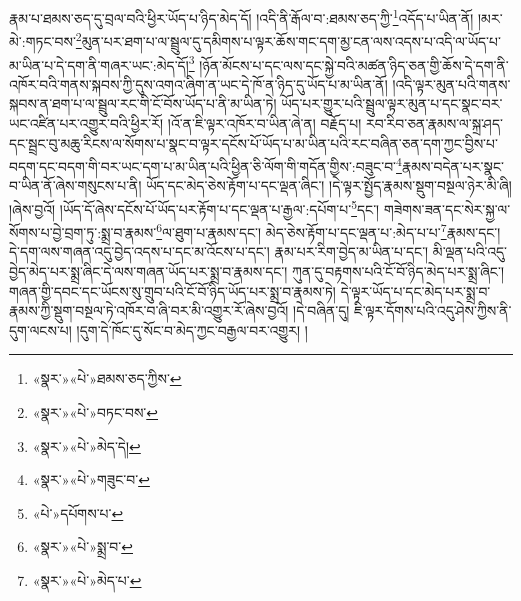 རྣམ་པ་ཐམས་ཅད་དུ་བྲལ་བའི་ཕྱིར་ཡོད་པ་ཉིད་མེད་དོ། །འདི་ནི་རྒོལ་བ་:ཐམས་ཅད་ཀྱི་\footnote{«སྣར་»«པེ་»ཐམས་ཅད་ཀྱིས་}འདོད་པ་ཡིན་ནོ། །མར་མེ་:གཏང་བས་\footnote{«སྣར་»«པེ་»བཏང་བས་}མུན་པར་ཐག་པ་ལ་སྦྲུལ་དུ་དམིགས་པ་ལྟར་ཆོས་གང་དག་མྱ་ངན་ལས་འདས་པ་འདི་ལ་ཡོད་པ་མ་ཡིན་པ་དེ་དག་ནི་གཞར་ཡང་:མེད་དོ།\footnote{«སྣར་»«པེ་»མེད་དེ།} །ཉོན་མོངས་པ་དང་ལས་དང་སྐྱེ་བའི་མཚན་ཉིད་ཅན་གྱི་ཆོས་དེ་དག་ནི་འཁོར་བའི་གནས་སྐབས་ཀྱི་དུས་འགའ་ཞིག་ན་ཡང་དེ་ཁོ་ན་ཉིད་དུ་ཡོད་པ་མ་ཡིན་ནོ། །འདི་ལྟར་མུན་པའི་གནས་སྐབས་ན་ཐག་པ་ལ་སྦྲུལ་རང་གི་ངོ་བོས་ཡོད་པ་ནི་མ་ཡིན་ཏེ། ཡོད་པར་གྱུར་པའི་སྦྲུལ་ལྟར་མུན་པ་དང་སྣང་བར་ཡང་འཛིན་པར་འགྱུར་བའི་ཕྱིར་རོ། །འོ་ན་ཇི་ལྟར་འཁོར་བ་ཡིན་ཞེ་ན། བརྗོད་པ། རབ་རིབ་ཅན་རྣམས་ལ་སྐྲ་ཤད་དང་སྦྲང་བུ་མཆུ་རིངས་ལ་སོགས་པ་སྣང་བ་ལྟར་དངོས་པོ་ཡོད་པ་མ་ཡིན་པའི་རང་བཞིན་ཅན་དག་ཀྱང་བྱིས་པ་བདག་དང་བདག་གི་བར་ཡང་དག་པ་མ་ཡིན་པའི་ཕྱིན་ཅི་ལོག་གི་གདོན་གྱིས་:བཟུང་བ་\footnote{«སྣར་»«པེ་»གཟུང་བ་}རྣམས་བདེན་པར་སྣང་བ་ཡིན་ནོ་ཞེས་གསུངས་པ་ནི། ཡོད་དང་མེད་ཅེས་རྟོག་པ་དང་ལྡན་ཞིང་། །དེ་ལྟར་སྤྱོད་རྣམས་སྡུག་བསྔལ་ཉེར་མི་ཞི། །ཞེས་བྱའོ། །ཡོད་དོ་ཞེས་དངོས་པོ་ཡོད་པར་རྟོག་པ་དང་ལྡན་པ་རྒྱལ་:དཔོག་པ་\footnote{«པེ་»དཔོགས་པ་}དང་། གཟེགས་ཟན་དང་སེར་སྐྱ་ལ་སོགས་པ་བྱེ་བྲག་ཏུ་:སྨྲ་བ་རྣམས་\footnote{«སྣར་»«པེ་»སྨྲ་བ་}ལ་ཐུག་པ་རྣམས་དང་། མེད་ཅེས་རྟོག་པ་དང་ལྡན་པ་:མེད་པ་པ་\footnote{«སྣར་»«པེ་»མེད་པ་}རྣམས་དང་། དེ་དག་ལས་གཞན་འདུ་བྱེད་འདས་པ་དང་མ་འོངས་པ་དང་། རྣམ་པར་རིག་བྱེད་མ་ཡིན་པ་དང་། མི་ལྡན་པའི་འདུ་བྱེད་མེད་པར་སྨྲ་ཞིང་དེ་ལས་གཞན་ཡོད་པར་སྨྲ་བ་རྣམས་དང་། ཀུན་དུ་བརྟགས་པའི་ངོ་བོ་ཉིད་མེད་པར་སྨྲ་ཞིང་། གཞན་གྱི་དབང་དང་ཡོངས་སུ་གྲུབ་པའི་ངོ་བོ་ཉིད་ཡོད་པར་སྨྲ་བ་རྣམས་ཏེ། དེ་ལྟར་ཡོད་པ་དང་མེད་པར་སྨྲ་བ་རྣམས་ཀྱི་སྡུག་བསྔལ་ཏེ་འཁོར་བ་ཞི་བར་མི་འགྱུར་རོ་ཞེས་བྱའོ། །དེ་བཞིན་དུ། ཇི་ལྟར་དོགས་པའི་འདུ་ཤེས་ཀྱིས་ནི་དུག་ལངས་པ། །དུག་དེ་ཁོང་དུ་སོང་བ་མེད་ཀྱང་བརྒྱལ་བར་འགྱུར། །
